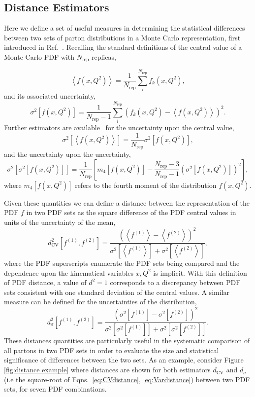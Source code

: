 \documentclass[12pt,twoside,openright]{report}
\newcommand{\be}{\begin{equation}}
\newcommand{\ee}{\end{equation}}
\begin{document}
\begin{spacing}{1.5}
\chapter{Distance Estimators}
\label{app:distances}
Here we define a set of useful measures in determining the statistical differences between two sets of parton distributions in a Monte Carlo representation, first introduced in Ref.~\cite{Ball:2010de}. Recalling the standard
definitions of the central value of a Monte Carlo PDF with $N_{\text{rep}}$ replicas,

\be \left< f (x,Q^2) \right> = \frac{1}{N_{\text{rep}}}\sum_i^{N_{\text{rep}}} f_k(x,Q^2), \ee
and its associated uncertainty,
\be \sigma^2\left[ f (x,Q^2) \right] = \frac{1}{N_{\text{rep}}-1}\sum_i^{N_{\text{rep}}} \left( f_k(x,Q^2) - \left<f(x,Q^2)\right>\right)^2.  \ee
Further estimators are available~\cite{Beringer:1900zz} for the uncertainty upon the central value,
\be \sigma^2\left[\left<f(x,Q^2)\right>\right] = \frac{1}{N_{\text{rep}}} \sigma^2\left[ f (x,Q^2) \right], \ee
and the uncertainty upon the uncertainty,
\be \sigma^2\left[\sigma^2\left[f(x,Q^2)\right]\right] = \frac{1}{N_{\text{rep}}} \left[ m_4\left[f(x,Q^2)\right] - \frac{N_{\text{rep}} - 3}{N_{\text{rep}} - 1} \left( \sigma^2\left[f(x,Q^2)\right] \right)^2 \right],\ee
where $m_4\left[f(x,Q^2)\right]$ refers to the fourth moment of the distribution $f(x,Q^2)$.

Given these quantities we can define a distance between the representation of the PDF $f$ in two PDF sets as the square difference of the PDF central values in units of the uncertainty of the mean,
\be d^2_{\text{CV}}\left[f^{(1)},f^{(2)}\right] = \frac{\left(\left<f^{(1)}\right> - \left<f^{(2)}\right> \right)^2}
{\sigma^2 \left[\left<f^{(1)}\right>\right] + \sigma^2 \left[\left<f^{(2)}\right>\right]},
\label{eq:CVdistance}
\ee
where the PDF superscripts enumerate the PDF sets being compared and the dependence upon the kinematical variables $x,Q^2$ is implicit. With this definition of PDF distance, a value of $d^2=1$ corresponds
to a discrepancy between PDF sets consistent with one standard deviation of the central values. A similar measure can be defined for the uncertainties of the distribution,
\be d^2_{\sigma}\left[f^{(1)},f^{(2)}\right] = \frac{\left(\sigma^2 \left[f^{(1)}\right] - \sigma^2 \left[f^{(2)}\right] \right)^2}
{\sigma^2 \left[\sigma^2 \left[f^{(1)}\right]\right] + \sigma^2 \left[\sigma^2 \left[f^{(2)}\right]\right]}.
\label{eq:Vardistance}
\ee
These distances quantities are particularly useful in the systematic comparison of all partons in two PDF sets in order to evaluate the size and statistical significance of differences between the two sets. As an example,
consider Figure \ref{fig:distance example} where distances are shown for both estimators $d_{\text{CV}}$ and $d_\sigma$ (i.e the square-root of Eqns.~\ref{eq:CVdistance}, \ref{eq:Vardistance}) between two PDF sets, for seven PDF combinations.


\end{spacing}
\end{document}
